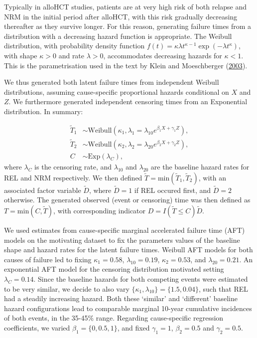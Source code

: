 \documentclass[
  letterpaper,
  DIV=11,
  numbers=noendperiod]{scrreprt}
\begin{document}
Typically in alloHCT studies, patients are at very high risk of both
relapse and NRM in the initial period after alloHCT, with this risk
gradually decreasing thereafter as they survive longer. For this reason,
generating failure times from a distribution with a decreasing hazard
function is appropriate. The Weibull distribution, with probability
density function
\(f(t) = \kappa \lambda t^{\kappa - 1} \exp (-\lambda t^{\kappa})\),
with shape \(\kappa > 0\) and rate \(\lambda > 0\), accommodates
decreasing hazards for \(\kappa < 1\). This is the parametrisation used
in the text by Klein and Moeschberger
(\protect\hyperlink{ref-kleinSurvivalAnalysisTechniques2006}{2003}).

We thus generated both latent failure times from independent Weibull
distributions, assuming cause-specific proportional hazards conditional
on \(X\) and \(Z\). We furthermore generated independent censoring times
from an Exponential distribution. In summary:

\begin{align*}
    \tilde{T}_1 &\sim \text{Weibull}(\kappa_1, \lambda_1 = \lambda_{10}e^{\beta_1 X + \gamma_1 Z}), \\
    \tilde{T}_2 &\sim \text{Weibull}(\kappa_2, \lambda_2 = \lambda_{20}e^{\beta_2 X + \gamma_2 Z}), \\
    C &\sim \text{Exp}(\lambda_C),
\end{align*} where \(\lambda_C\) is the censoring rate, and
\(\lambda_{10}\) and \(\lambda_{20}\) are the baseline hazard rates for
REL and NRM respectively. We then defined
\(\tilde{T} = \text{min}(\tilde{T}_1, \tilde{T}_2)\), with an associated
factor variable \(\tilde{D}\), where \(\tilde{D} =1\) if REL occured
first, and \(\tilde{D} = 2\) otherwise. The generated observed (event or
censoring) time was then defined as \(T = \text{min}(C, \tilde{T})\),
with corresponding indicator \(D = I(\tilde{T} \leq C)\tilde{D}\).

We used estimates from cause-specific marginal accelerated failure time
(AFT) models on the motivating dataset to fix the parameters values of
the baseline shape and hazard rates for the latent failure times.
Weibull AFT models for both causes of failure led to fixing
\(\kappa_1 = 0.58\), \(\lambda_{10} = 0.19\), \(\kappa_2 = 0.53\), and
\(\lambda_{20} = 0.21\). An exponential AFT model for the censoring
distribution motivated setting \(\lambda_C = 0.14\). Since the baseline
hazards for both competing events were estimated to be very similar, we
decide to also vary \(\{\kappa_1,\lambda_{10}\} = \{1.5,0.04\}\), such
that REL had a steadily increasing hazard. Both these `similar' and
`different' baseline hazard configurations lead to comparable marginal
10-year cumulative incidences of both events, in the 35-45\% range.
Regarding cause-specific regression coefficients, we varied
\(\beta_1 = \{0, 0.5, 1\}\), and fixed \(\gamma_1 = 1\),
\(\beta_2 = 0.5\) and \(\gamma_2 = 0.5\).
\end{document}
